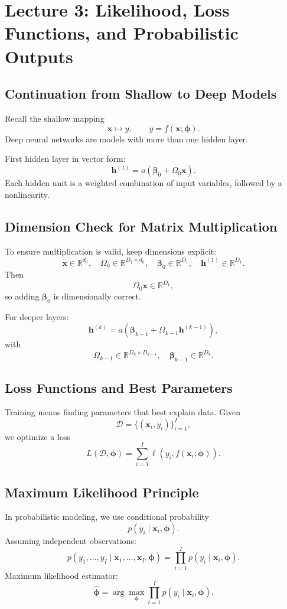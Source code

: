 \newpage
\section{Lecture 3: Likelihood, Loss Functions, and Probabilistic Outputs}

\subsection{Continuation from Shallow to Deep Models}
Recall the shallow mapping
\[
\mathbf{x}\longmapsto y,\qquad y=f(\mathbf{x};\boldsymbol{\phi}).
\]
Deep neural networks are models with more than one hidden layer.

First hidden layer in vector form:
\[
\mathbf{h}^{(1)} = a\!\left(\boldsymbol{\beta}_0+\Omega_0\mathbf{x}\right).
\]
Each hidden unit is a weighted combination of input variables, followed by a
nonlinearity.

\subsection{Dimension Check for Matrix Multiplication}
To ensure multiplication is valid, keep dimensions explicit:
\[
\mathbf{x}\in\mathbb{R}^{d_0},\quad
\Omega_0\in\mathbb{R}^{D_1\times d_0},\quad
\boldsymbol{\beta}_0\in\mathbb{R}^{D_1},\quad
\mathbf{h}^{(1)}\in\mathbb{R}^{D_1}.
\]
Then
\[
\Omega_0\mathbf{x}\in\mathbb{R}^{D_1},
\]
so adding $\boldsymbol{\beta}_0$ is dimensionally correct.

For deeper layers:
\[
\mathbf{h}^{(k)} = a\!\left(\boldsymbol{\beta}_{k-1}+\Omega_{k-1}\mathbf{h}^{(k-1)}\right),
\]
with
\[
\Omega_{k-1}\in\mathbb{R}^{D_k\times D_{k-1}},
\quad
\boldsymbol{\beta}_{k-1}\in\mathbb{R}^{D_k}.
\]

\subsection{Loss Functions and Best Parameters}
Training means finding parameters that best explain data.
Given
\[
\mathcal{D}=\{(\mathbf{x}_i,y_i)\}_{i=1}^{I},
\]
we optimize a loss
\[
L(\mathcal{D},\boldsymbol{\phi})=\sum_{i=1}^{I}\ell\!\left(y_i,f(\mathbf{x}_i;\boldsymbol{\phi})\right).
\]

\subsection{Maximum Likelihood Principle}
In probabilistic modeling, we use conditional probability
\[
p(y_i\mid \mathbf{x}_i,\boldsymbol{\phi}).
\]
Assuming independent observations:
\[
p(y_1,\dots,y_I\mid \mathbf{x}_1,\dots,\mathbf{x}_I,\boldsymbol{\phi})
=
\prod_{i=1}^{I}p(y_i\mid \mathbf{x}_i,\boldsymbol{\phi}).
\]
Maximum likelihood estimator:
\[
\hat{\boldsymbol{\phi}}
=
\arg\max_{\boldsymbol{\phi}}
\prod_{i=1}^{I}p(y_i\mid \mathbf{x}_i,\boldsymbol{\phi}).
\]

